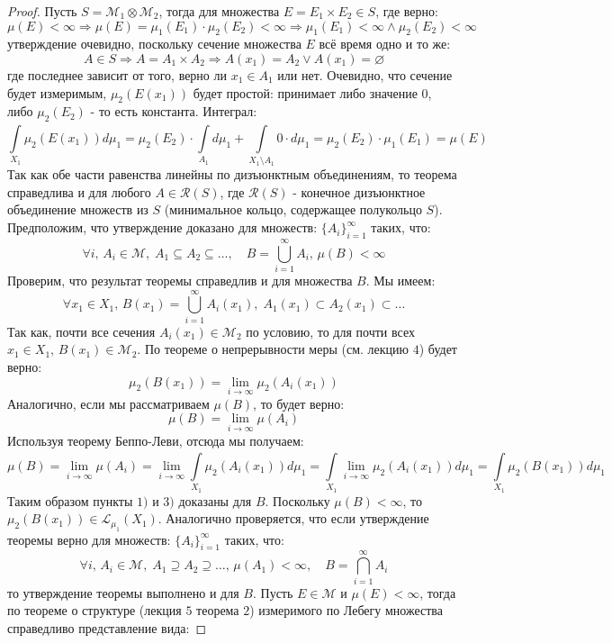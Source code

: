 \documentclass[12pt]{article}
\newcommand{\MCR}{\mathcal{R}}
\newcommand{\ML}{\mathcal{L}}
\newcommand{\MM}{\mathcal{M}}
\newcommand{\VN}{\varnothing}
\theoremstyle{definition}
\newcommand{\ddint}[2]{\displaystyle\int\limits_{#1}^{#2}}
\begin{document}
\begin{proof}
	Пусть $S = \MM_1 \otimes \MM_2$, тогда для множества $E = E_1 \times E_2 \in S$, где верно: 
	$$
		\mu(E) < \infty \Rightarrow \mu(E) = \mu_1(E_1){\cdot}\mu_2(E_2) < \infty \Rightarrow \mu_1(E_1) < \infty \wedge \mu_2(E_2) < \infty
	$$ 
	утверждение очевидно, поскольку сечение множества $E$ всё время одно и то же:
	$$
		A \in S \Rightarrow A = A_1 \times A_2 \Rightarrow A(x_1) = A_2 \vee A(x_1) = \VN 
	$$
	где последнее зависит от того, верно ли $x_1 \in A_1$ или нет. Очевидно, что сечение будет измеримым, $\mu_2(E(x_1))$ будет простой: принимает либо значение $0$, либо $\mu_2(E_2)$ - то есть константа. Интеграл:
	$$
		\ddint{X_1}{}\mu_2(E(x_1))d\mu_1 = \mu_2(E_2){\cdot}\ddint{A_1}{}d\mu_1 + \ddint{X_1 \setminus A_1}{}0{\cdot}d\mu_1 = \mu_2(E_2){\cdot}\mu_1(E_1) =  \mu(E) 
	$$
	Так как обе части равенства линейны по дизъюнктным объединениям, то теорема справедлива и для любого $A \in \MCR(S)$, где $\MCR(S)$ - конечное дизъюнктное объединение множеств из $S$ (минимальное кольцо, содержащее полукольцо $S$). Предположим, что утверждение доказано для множеств: $\{A_i\}_{i = 1}^{\infty}$ таких, что:
	$$
		\forall i, \, A_i \in \MM, \; A_1 \subseteq A_2 \subseteq \dotsc, \quad B = \bigcup\limits_{i = 1}^{\infty}A_i, \, \mu(B) < \infty
	$$
	Проверим, что результат теоремы справедлив и для множества $B$. Мы имеем:
	$$
		\forall x_1 \in X_1, \, B(x_1) = \bigcup\limits_{i = 1}^{\infty}A_i(x_1), \; A_1(x_1) \subset A_2(x_1) \subset \dotsc
	$$
	Так как, почти все сечения $A_i(x_1) \in \MM_2$ по условию, то для почти всех $x_1 \in X_1, \, B(x_1) \in \MM_2$. По теореме о непрерывности меры (см. лекцию $4$) будет верно:
	$$
		\mu_2(B(x_1)) = \lim\limits_{i \to \infty}\mu_2(A_i(x_1))
	$$
	Аналогично, если мы рассматриваем $\mu(B)$, то будет верно:
	$$
		\mu(B) = \lim\limits_{i\to \infty}\mu(A_i)
	$$
	Используя теорему Беппо-Леви, отсюда мы получаем:
	$$
		\mu(B) = \lim\limits_{i \to \infty}\mu(A_i) = \lim\limits_{i \to \infty}\ddint{X_1}{}\mu_2(A_i(x_1))d\mu_1 = \ddint{X_1}{}\lim\limits_{i \to \infty}\mu_2(A_i(x_1))d\mu_1 = \ddint{X_1}{}\mu_2(B(x_1))d\mu_1
	$$
	Таким образом пункты $1)$ и $3)$ доказаны для $B$. Поскольку $\mu(B) < \infty$, то $\mu_2(B(x_1)) \in \ML_{\mu_1}(X_1)$. Аналогично проверяется, что если утверждение теоремы верно для множеств: $\{A_i\}_{i = 1}^{\infty}$ таких, что:
	$$
		\forall i, \, A_i \in \MM, \; A_1 \supseteq A_2 \supseteq \dotsc,\, \mu(A_1) < \infty, \quad B = \bigcap\limits_{i = 1}^{\infty}A_i
	$$
	то утверждение теоремы выполнено и для $B$. Пусть $E \in \MM$ и $\mu(E) < \infty$, тогда по теореме о структуре (лекция $5$ теорема $2$) измеримого по Лебегу множества справедливо представление вида:

\end{proof}
\end{document}
